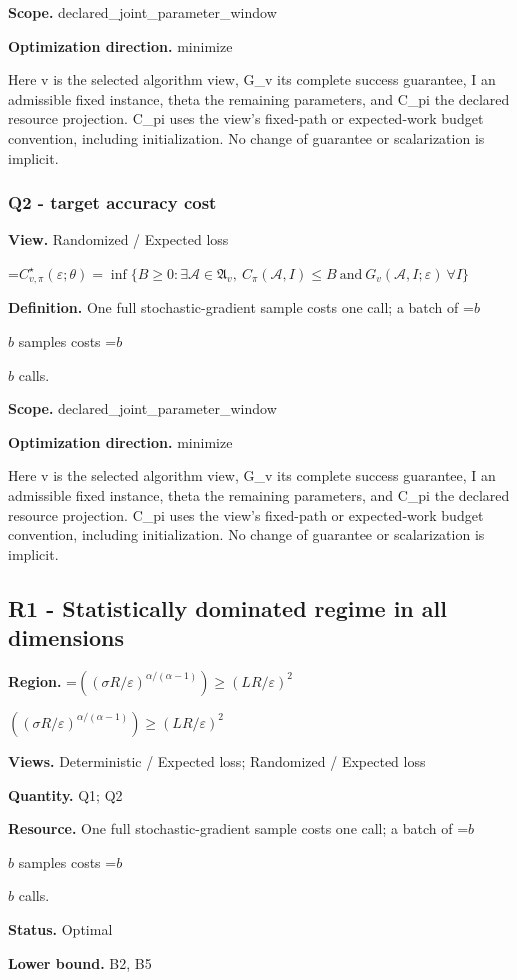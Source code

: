 \documentclass[10pt,a4paper]{article}
\newcommand{\AtlasMath}[1]{\par\begingroup\centering\setbox0=\hbox{$\displaystyle #1$}\ifdim\wd0>1.4\linewidth\typeout{ATLAS WIDE FORMULA: \the\wd0}\fi\ifdim\wd0>\linewidth\resizebox{\linewidth}{!}{\box0}\else\box0\fi\par\endgroup}
\newcommand{\AtlasInlineMath}[1]{\begingroup\setbox0=\hbox{$#1$}\ifdim\wd0>.4\linewidth\endgroup\AtlasMath{#1}\else\endgroup$#1$\fi}
\begin{document}
\textbf{Scope.} declared\_joint\_parameter\_window

\textbf{Optimization direction.} minimize

Here v is the selected algorithm view, G\_v its complete success guarantee, I an admissible fixed instance, theta the remaining parameters, and C\_pi the declared resource projection. C\_pi uses the view's fixed-path or expected-work budget convention, including initialization. No change of guarantee or scalarization is implicit.

\subsubsection{Q2 - target accuracy cost}
\textbf{View.} Randomized / Expected loss

\AtlasMath{C^\star_{v,\pi}(\varepsilon;\theta)=\inf\{B\ge0:\exists\mathcal A\in\mathfrak A_v,\ C_\pi(\mathcal A,I)\le B\ \text{and}\ G_v(\mathcal A,I;\varepsilon)\ \forall I\}}
\textbf{Definition.} One full stochastic-gradient sample costs one call; a batch of \AtlasInlineMath{b} samples costs \AtlasInlineMath{b} calls.

\textbf{Scope.} declared\_joint\_parameter\_window

\textbf{Optimization direction.} minimize

Here v is the selected algorithm view, G\_v its complete success guarantee, I an admissible fixed instance, theta the remaining parameters, and C\_pi the declared resource projection. C\_pi uses the view's fixed-path or expected-work budget convention, including initialization. No change of guarantee or scalarization is implicit.

\subsection{R1 - Statistically dominated regime in all dimensions}
\textbf{Region.} \AtlasInlineMath{((\sigma R/\varepsilon)^{\alpha/(\alpha-1)})\ge (LR/\varepsilon)^2}

\textbf{Views.} Deterministic / Expected loss; Randomized / Expected loss

\textbf{Quantity.} Q1; Q2

\textbf{Resource.} One full stochastic-gradient sample costs one call; a batch of \AtlasInlineMath{b} samples costs \AtlasInlineMath{b} calls.

\textbf{Status.} Optimal

\textbf{Lower bound.} B2, B5
\end{document}
